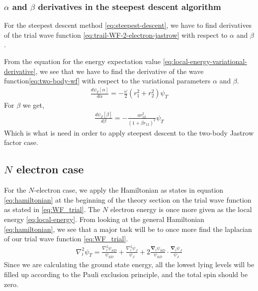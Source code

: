 \documentclass[11pt]{article}
\begin{document}
\subsubsection{\texorpdfstring{$\alpha$}{a} and \texorpdfstring{$\beta$}{b} derivatives in the steepest descent algorithm}
For the steepest descent method \eqref{eq:steepest-descent}, we have to find derivatives of the trial wave function \eqref{eq:trail-WF-2-electron-jastrow} with respect to $\alpha$ and $\beta$. 

From the equation for the energy expectation value \eqref{eq:local-energy-variational-derivative}, we see that we have to find the derivative of the wave function\eqref{eq:two-body-wf} with respect to the variational parameters $\alpha$ and $\beta$.
\begin{align}
	\frac{d\psi_T[\alpha]}{d\alpha} = -\frac{\omega}{2}(r_1^2 + r_2^2)\psi_T
	\label{eq:2body-alpha-derivative}
\end{align}
For $\beta$ we get,
\begin{align}
	\frac{d\psi_T[\beta]}{d\beta} = -\frac{a r_{12}^2}{(1+\beta r_{12})^2}\psi_T
	\label{eq:2body-beta-derivative}
\end{align}
Which is what is need in order to apply steepest descent to the two-body Jastrow factor case.

\subsection{\texorpdfstring{$N$}{N} electron case}
For the $N$-electron case, we apply the Hamiltonian as states in equation \eqref{eq:hamiltonian} at the beginning of the theory section on the trial wave function as stated in \eqref{eq:WF_trial}. The $N$ electron energy is once more given as the local energy \eqref{eq:local-energy}. From looking at the general Hamiltonian \eqref{eq:hamiltonian}, we see that a major task will be to once more find the laplacian of our trial wave function \eqref{eq:WF_trial}.
\begin{align}
	\nabla_i^2\psi_T = \frac{\nabla^2_i\psi_{SD}}{\psi_{SD}} + \frac{\nabla^2_i\psi_J}{\psi_J} + 2\frac{\bm{\nabla}_i\psi_{SD}}{\psi_{SD}}\cdot\frac{\bm{\nabla}_i\psi_{J}}{\psi_J}
	\label{eq:laplacian-n-electron}
\end{align}
Since we are calculating the ground state energy, all the lowest lying levels will be filled up according to the Pauli exclusion principle, and the total spin should be zero.
\end{document}
